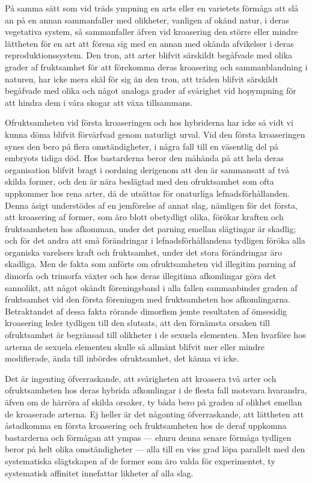 På samma sätt som vid träds ympning en arts eller en varietets förmåga att slå an på en annan sammanfaller med olikheter, vanligen af okänd natur, i deras vegetativa system, så sammanfaller äfven vid kroasering den större eller mindre lättheten för en art att förena sig med en annan med okända afvikelser i deras reproduktionssystem. Den tron, att arter blifvit särskildt begåfvade med olika grader af fruktsamhet för att förekomma deras kroasering och sammanblandning i naturen, har icke mera skäl för sig än den tron, att träden blifvit särskildt begåfvade med olika och något analoga grader af svårighet vid hopympning för att hindra dem i våra skogar att växa tillsammans.

Ofruktsamheten vid första kroaseringen och hos hybriderna har icke så vidt vi kunna döma blifvit förvärfvad genom naturligt urval. Vid den första kroaseringen synes den bero på flera omständigheter, i några fall till en väsentlig del på embryots tidiga död. Hos bastarderna beror den måhända på att hela deras organisation blifvit bragt i oordning derigenom att den är sammansatt af två skilda former, och den är nära beslägtad med den ofruktsamhet som ofta uppkommer hos rena arter, då de utsättas för onaturliga lefnadsförhållanden. Denna åsigt understödes af en jemförelse af annat slag, nämligen för det första, att kroasering af former, som äro blott obetydligt olika, förökar kraften och fruktsamheten hos afkomman, under det parning emellan slägtingar är skadlig; och för det andra att små förändringar i lefnadsförhållandena tydligen föröka alla organiska varelsers kraft och fruktsamhet, under det stora förändringar äro skadliga. Men de fakta som anförts om ofruktsamheten vid illegitim parning af dimorfa och trimorfa växter och hos deras illegitima afkomlingar göra det sannolikt, att något okändt föreningsband i alla fallen sammanbinder graden af fruktsamhet vid den första föreningen med fruktsamheten hos afkomlingarna. Betraktandet af dessa fakta rörande dimorfism jemte resultaten af ömsesidig kroasering leder tydligen till den slutsats, att den förnämsta orsaken till ofruktsamhet är begränsad till olikheter i de sexuela elementen. Men hvarföre hos arterna de sexuela elementen skulle så allmänt blifvit mer eller mindre modifierade, ända till inbördes ofruktsamhet, det känna vi icke.

Det är ingenting öfverraskande, att svårigheten att kroasera två arter och ofruktsamheten hos deras hybrida afkomlingar i de flesta fall motsvara hvarandra, äfven om de härröra af skilda orsaker, ty båda bero på graden af olikhet emellan de kroaserade arterna. Ej heller är det någonting öfverraskande, att lättheten att åstadkomma en första kroasering och fruktsamheten hos de deraf uppkomna bastarderna och förmågan att ympas — ehuru denna senare förmåga tydligen beror på helt olika omständigheter — alla till en viss grad löpa parallelt med den systematiska slägtskapen af de former som äro valda för experimentet, ty systematisk affinitet innefattar likheter af alla slag.

